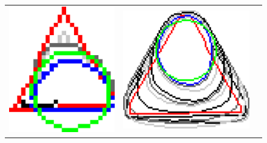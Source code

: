 \begin{figure}
\begin{tabular}{ccc}
\includegraphics[scale=0.25]{figures/chapter5/mdca-larger-neighborhood/triangle/0.01/1.0/summary.pdf} &
\includegraphics[scale=0.25]{figures/chapter5/mdca-larger-neighborhood/triangle/0.01/0.5/summary.pdf} &

\end{tabular}
\end{figure}
